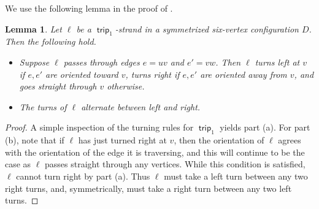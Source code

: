 \documentclass{amsart}
\newtheorem{lemma}[theorem]{Lemma}
\theoremstyle{definition}
\theoremstyle{remark}
\numberwithin{equation}{section}
\DeclareMathOperator{\trip}{\mathsf{trip}}
\begin{document}
We use the following lemma in the proof of .
\begin{lemma}
\label{lem:left-right-alternate}
Let $\ell$ be a $\trip_1$-strand in a symmetrized six-vertex configuration $D$. Then the following hold.
\begin{itemize}
    \item[(a)] Suppose $\ell$ passes through edges $e = uv$ and $e' = vw$. Then $\ell$ turns left at $v$ if $e,e'$ are oriented toward $v$, turns right if $e,e'$ are oriented away from $v$, and goes straight through $v$ otherwise.
    \item[(b)] The turns of $\ell$ alternate between left and right.
\end{itemize}
\end{lemma}
\begin{proof}
A simple inspection of the turning rules for $\trip_1$ yields part (a). For part (b), note that if $\ell$ has just turned right at $v$, then the orientation of $\ell$ agrees with the orientation of the edge it is traversing, and this will continue to be the case as $\ell$ passes straight through any vertices. While this condition is satisfied, $\ell$ cannot turn right by part (a). Thus $\ell$ must take a left turn between any two right turns, and, symmetrically, must take a right turn between any two left turns.
\end{proof}
\end{document}
